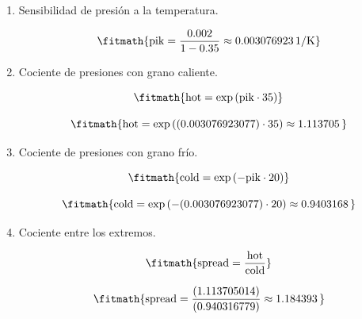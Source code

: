 \begin{enumerate}

\item Sensibilidad de presión a la temperatura.

\[\fitmath{\mathrm{pik}=\frac{0.002}{1-0.35}\approx 0.003076923\,\mathrm{1/K}}\]

\item Cociente de presiones con grano caliente.

\[\fitmath{\mathrm{hot}=\exp\left(\mathrm{pik}\cdot 35\right)}\]

\[\fitmath{\mathrm{hot}=\exp\left((0.003076923077)\cdot 35\right)\approx 1.113705\,}\]

\item Cociente de presiones con grano frío.

\[\fitmath{\mathrm{cold}=\exp\left(-\mathrm{pik}\cdot 20\right)}\]

\[\fitmath{\mathrm{cold}=\exp\left(-(0.003076923077)\cdot 20\right)\approx 0.9403168\,}\]

\item Cociente entre los extremos.

\[\fitmath{\mathrm{spread}=\frac{\mathrm{hot}}{\mathrm{cold}}}\]

\[\fitmath{\mathrm{spread}=\frac{(1.113705014)}{(0.940316779)}\approx 1.184393\,}\]

\end{enumerate}
